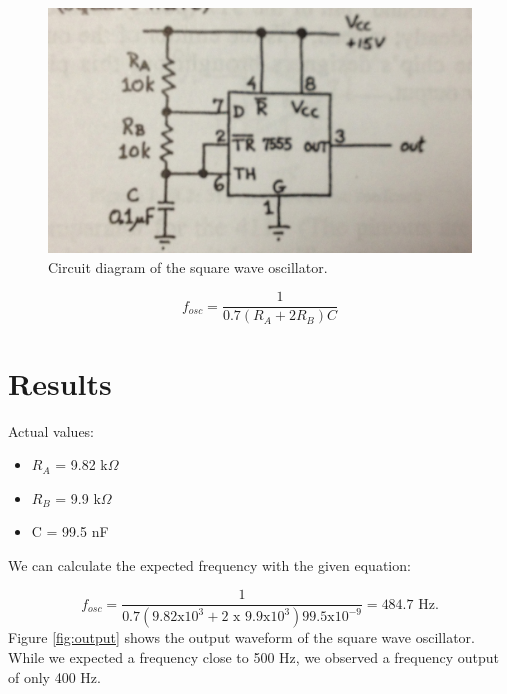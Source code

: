 \documentclass[12pt,letterpaper]{report}
\newlength \figwidth
\begin{document}
\begin{figure}
\centering
\includegraphics[width=\figwidth, keepaspectratio=true]{lab8_images/circuit.jpg}
\caption{Circuit diagram of the square wave oscillator.}
\label{fig:circuit}
\end{figure}

\begin{equation} \label{eq:frequency}
f_{osc}=\frac{1}{0.7(R_A + 2R_B)C}
\end{equation}

\section*{Results}

Actual values:
\begin{itemize}
\item $R_A$ = 9.82 k$\Omega$
\item $R_B$ = 9.9 k$\Omega$
\item C = 99.5 nF
\end{itemize}

We can calculate the expected frequency with the given equation:

$$
f_{osc} = \frac{1}{0.7(9.82\text{x}10^3 + 2\text{ x }9.9\text{x}10^3)99.5\text{x}10^{-9}} = 484.7 \text{ Hz.}
$$
Figure \ref{fig:output} shows the output waveform of the square wave oscillator. While we expected a frequency close to 500 Hz, we observed a frequency output of only 400 Hz.
\end{document}
